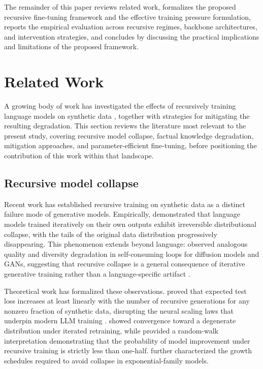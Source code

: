 \documentclass[a4paper,fleqn]{cas-dc}
\begin{document}
The remainder of this paper reviews related work, formalizes the proposed
recursive fine-tuning framework and the effective training pressure formulation,
reports the empirical evaluation across recursive regimes, backbone
architectures, and intervention strategies, and concludes by discussing the
practical implications and limitations of the proposed framework.

\section{Related Work}\label{sec:related}

A growing body of work has investigated the effects of recursively training
language models on synthetic data \citep{villalobos2024}, together with
strategies for mitigating the resulting degradation. This section reviews the
literature most relevant to the present study, covering recursive model
collapse, factual knowledge degradation, mitigation approaches, and
parameter-efficient fine-tuning, before positioning the contribution of this
work within that landscape.

\subsection{Recursive model collapse}

Recent work has established recursive training on synthetic data as a distinct
failure mode of generative models. Empirically, \citet{shumailov2024}
demonstrated that language models trained iteratively on their own outputs
exhibit irreversible distributional collapse, with the tails of the original
data distribution progressively disappearing. This phenomenon extends beyond
language: \citet{alemohammad2024} observed analogous quality and diversity
degradation in self-consuming loops for diffusion models and GANs, suggesting
that recursive collapse is a general consequence of iterative generative
training rather than a language-specific artifact \citep{guo2024collapse}.

Theoretical work has formalized these observations. \citet{dohmatob2025}
proved that expected test loss increases at least linearly with the number of
recursive generations for any nonzero fraction of synthetic data, disrupting
the neural scaling laws that underpin modern LLM training
\citep{kaplan2020scaling,dohmatob2024scaling}.
\citet{seddik2024} showed convergence toward a degenerate distribution under
iterated retraining, while \citet{xu2025} provided a random-walk interpretation
demonstrating that the probability of model improvement under recursive training
is strictly less than one-half. \citet{dey2024} further characterized the
growth schedules required to avoid collapse in exponential-family models.
\end{document}
